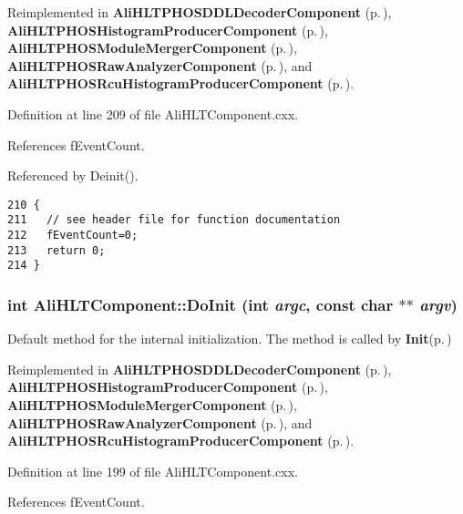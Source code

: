 Reimplemented in {\bf Ali\-HLTPHOSDDLDecoder\-Component} {\rm (p.\,\pageref{classAliHLTPHOSDDLDecoderComponent_a6})}, {\bf Ali\-HLTPHOSHistogram\-Producer\-Component} {\rm (p.\,\pageref{classAliHLTPHOSHistogramProducerComponent_a6})}, {\bf Ali\-HLTPHOSModule\-Merger\-Component} {\rm (p.\,\pageref{classAliHLTPHOSModuleMergerComponent_a6})}, {\bf Ali\-HLTPHOSRaw\-Analyzer\-Component} {\rm (p.\,\pageref{classAliHLTPHOSRawAnalyzerComponent_a6})}, and {\bf Ali\-HLTPHOSRcu\-Histogram\-Producer\-Component} {\rm (p.\,\pageref{classAliHLTPHOSRcuHistogramProducerComponent_a4})}.

Definition at line 209 of file Ali\-HLTComponent.cxx.

References f\-Event\-Count.

Referenced by Deinit().

\footnotesize\begin{verbatim}210 {
211   // see header file for function documentation
212   fEventCount=0;
213   return 0;
214 }
\end{verbatim}\normalsize 


\subsubsection{\setlength{\rightskip}{0pt plus 5cm}int Ali\-HLTComponent::Do\-Init (int {\em argc}, const char $\ast$$\ast$ {\em argv})\hspace{0.3cm}{\tt  [protected, virtual]}}\label{classAliHLTComponent_b5}


Default method for the internal initialization. The method is called by {\bf Init}{\rm (p.\,\pageref{classAliHLTComponent_a4})} 

Reimplemented in {\bf Ali\-HLTPHOSDDLDecoder\-Component} {\rm (p.\,\pageref{classAliHLTPHOSDDLDecoderComponent_a4})}, {\bf Ali\-HLTPHOSHistogram\-Producer\-Component} {\rm (p.\,\pageref{classAliHLTPHOSHistogramProducerComponent_a4})}, {\bf Ali\-HLTPHOSModule\-Merger\-Component} {\rm (p.\,\pageref{classAliHLTPHOSModuleMergerComponent_a4})}, {\bf Ali\-HLTPHOSRaw\-Analyzer\-Component} {\rm (p.\,\pageref{classAliHLTPHOSRawAnalyzerComponent_a4})}, and {\bf Ali\-HLTPHOSRcu\-Histogram\-Producer\-Component} {\rm (p.\,\pageref{classAliHLTPHOSRcuHistogramProducerComponent_a2})}.

Definition at line 199 of file Ali\-HLTComponent.cxx.

References f\-Event\-Count.

